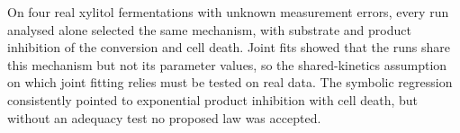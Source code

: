 \item On four real xylitol fermentations with unknown measurement errors, every run analysed alone selected the same mechanism, with substrate and product inhibition of the conversion and cell death. Joint fits showed that the runs share this mechanism but not its parameter values, so the shared-kinetics assumption on which joint fitting relies must be tested on real data. The symbolic regression consistently pointed to exponential product inhibition with cell death, but without an adequacy test no proposed law was accepted.
